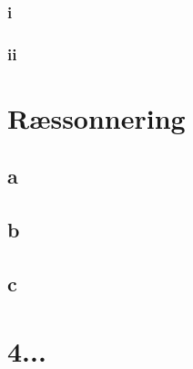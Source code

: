 \documentclass{article}
\begin{document}
\subsubsection{i}

\subsubsection{ii}

\section{Ræssonnering}

\subsection{a}
\subsection{b}
\subsection{c}

\section{4...}
\end{document}
